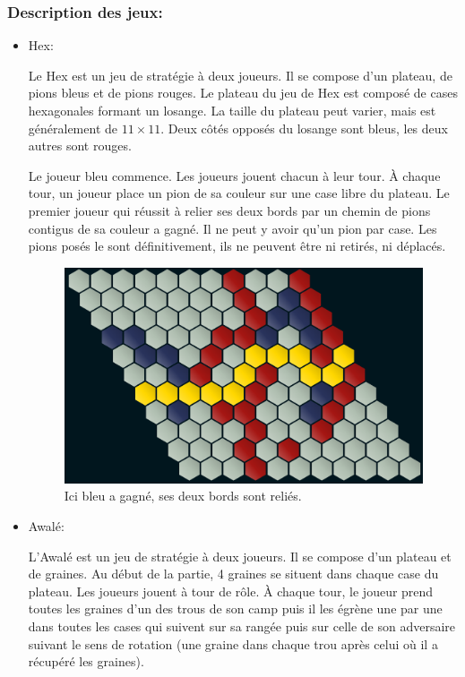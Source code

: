 \subsubsection*{Description des jeux:}
\begin{itemize}
    \item Hex:
    
    Le Hex est un jeu de stratégie à deux joueurs. Il se compose d'un plateau, de pions bleus
    et de pions rouges. Le plateau du jeu de Hex est composé de cases hexagonales formant un losange. La taille
    du plateau peut varier, mais est généralement de $11\times 11$. Deux côtés opposés du losange sont bleus, les deux 
    autres sont rouges. 

    Le joueur bleu commence. Les joueurs jouent chacun à leur tour. À chaque tour, un joueur place un pion de sa couleur sur une 
    case libre du plateau. Le premier joueur qui réussit à relier ses deux bords par un chemin de pions contigus de sa couleur
    a gagné. Il ne peut y avoir qu'un pion par case. Les pions posés le sont définitivement, ils ne peuvent être ni retirés, ni
    déplacés.\\
    \begin{figure}[h]
        \begin{center}
            \includegraphics[scale=0.5]{root/hex_jeu_bleu}
        \end{center}
        \caption{Ici bleu a gagné, ses deux bords sont reliés.}\label{fig:hex_jeu_bleu}
    \end{figure}
    

    \item Awalé:
    
    L'Awalé est un jeu de stratégie à deux joueurs. Il se compose d'un plateau et de graines. Au début de la partie, 4 graines se 
    situent dans chaque case du plateau. Les joueurs jouent à tour de rôle. À chaque tour, le joueur prend toutes les graines d’un 
    des trous de son camp puis il les égrène une par une dans toutes les cases qui suivent sur sa rangée puis sur celle de son adversaire 
    suivant le sens de rotation (une graine dans chaque trou après celui où il a récupéré les graines).


\end{itemize}

